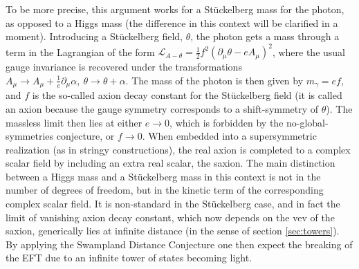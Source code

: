 \documentclass[11pt,a4paper]{article}
\begin{document}
To be more precise, this argument works for a St\"uckelberg mass for the photon, as opposed to a Higgs mass (the difference in this context will be clarified in a moment). Introducing  a St\"uckelberg field, $\theta$, the photon gets a mass through a term in the Lagrangian of the form  $\mathcal{L}_{A-\theta}=\frac{1}{2} f^{2}\left(\partial_{\mu} \theta-e A_{\mu}\right)^{2}$, where the usual gauge invariance is recovered under the transformations $A_{\mu} \rightarrow A_{\mu}+\frac{1}{e} \partial_{\mu} \alpha, \  \theta \rightarrow \theta+\alpha$. The mass of the photon is then given by $m_{\gamma}= e f$, and $f$ is the so-called axion decay constant for the St\"uckelberg field (it is called an axion because the gauge symmetry corresponds to a shift-symmetry of $\theta$). The massless limit then lies at either $e\rightarrow 0$, which is forbidden by the no-global-symmetries conjecture, or $f\rightarrow 0$. When embedded into a supersymmetric realization (as in stringy constructions), the real axion is completed  to a complex scalar field by including an extra real scalar, the saxion.  The main distinction between a Higgs mass and a St\"uckelberg mass in this context is not in the number of degrees of freedom, but in the kinetic term of the corresponding complex scalar field. It is non-standard in the St\"uckelberg case, and in fact the limit of vanishing axion decay constant, which now depends on the vev of the saxion, generically lies at infinite distance (in the sense of section \ref{sec:towers}). By applying the Swampland Distance Conjecture one then expect the breaking of the EFT due to an infinite tower of states becoming light.
\end{document}
